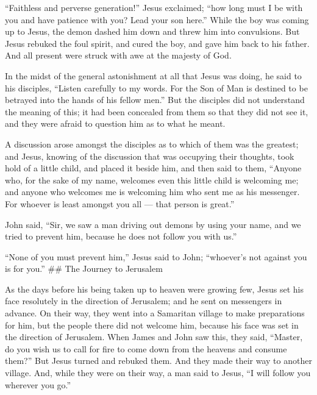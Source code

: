  ``Faithless and perverse generation!'' Jesus exclaimed;
``how long must I be with you and have patience with you? Lead your son
here.''  While the boy was coming up to Jesus, the demon
dashed him down and threw him into convulsions. But Jesus rebuked the
foul spirit, and cured the boy, and gave him back to his father.
 And all present were struck with awe at the majesty of
God.

In the midst of the general astonishment at all that Jesus was doing, he
said to his disciples,  ``Listen carefully to my words. For
the Son of Man is destined to be betrayed into the hands of his fellow
men.''  But the disciples did not understand the meaning of
this; it had been concealed from them so that they did not see it, and
they were afraid to question him as to what he meant.

 A discussion arose amongst the disciples as to which of
them was the greatest;  and Jesus, knowing of the
discussion that was occupying their thoughts, took hold of a little
child, and placed it beside him,  and then said to them,
``Anyone who, for the sake of my name, welcomes even this little child
is welcoming me; and anyone who welcomes me is welcoming him who sent me
as his messenger. For whoever is least amongst you all --- that person
is great.''

 John said, ``Sir, we saw a man driving out demons by using
your name, and we tried to prevent him, because he does not follow you
with us.''

 ``None of you must prevent him,'' Jesus said to John;
``whoever's not against you is for you.'' \#\# The Journey to Jerusalem

 As the days before his being taken up to heaven were
growing few, Jesus set his face resolutely in the direction of
Jerusalem; and he sent on messengers in advance.  On their
way, they went into a Samaritan village to make preparations for him,
 but the people there did not welcome him, because his face
was set in the direction of Jerusalem.  When James and John
saw this, they said, ``Master, do you wish us to call for fire to come
down from the heavens and consume them?''  But Jesus turned
and rebuked them.  And they made their way to another
village.  And, while they were on their way, a man said to
Jesus, ``I will follow you wherever you go.''


